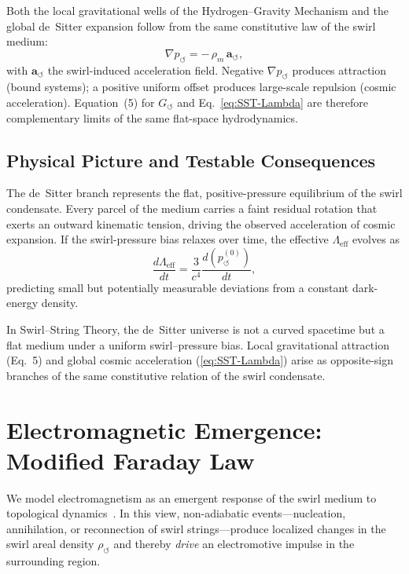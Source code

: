 \documentclass[10pt,reprint,aps,onecolumn,nofootinbib]{revtex4-2}
\begin{document}
        Both the local gravitational wells of the Hydrogen--Gravity Mechanism and the global de~Sitter expansion follow from the same constitutive law of the swirl medium:
        \[
            \nabla p_{\!\circlearrowleft} = -\,\rho_{\!m}\, \mathbf{a}_{\!\circlearrowleft},
        \]
        with $\mathbf{a}_{\!\circlearrowleft}$ the swirl-induced acceleration field.
        Negative $\nabla p_{\!\circlearrowleft}$ produces attraction (bound systems);
        a positive uniform offset produces large-scale repulsion (cosmic acceleration).
        Equation~(5) for $G_{\!\circlearrowleft}$ and Eq.~\eqref{eq:SST-Lambda} are therefore complementary limits of the same flat-space hydrodynamics.

    \subsection{Physical Picture and Testable Consequences}

        The de~Sitter branch represents the flat, positive-pressure equilibrium of the swirl condensate.
        Every parcel of the medium carries a faint residual rotation that exerts an outward kinematic tension, driving the observed acceleration of cosmic expansion.
        If the swirl-pressure bias relaxes over time, the effective $\Lambda_{\text{eff}}$ evolves as
        \begin{equation}
        \frac{d\Lambda_{\text{eff}}}{dt}
        = \frac{3}{c^{4}}\frac{d(p_{\!\circlearrowleft}^{(0)})}{dt},
        \end{equation}
        predicting small but potentially measurable deviations from a constant dark-energy density.

        \begin{tcolorbox}[colframe=gray, title={Summary}]
        In Swirl--String Theory, the de~Sitter universe is not a curved spacetime but a flat medium under a uniform swirl--pressure bias.
        Local gravitational attraction (Eq.~5) and global cosmic acceleration (\ref{eq:SST-Lambda}) arise as opposite-sign branches of the same constitutive relation of the swirl condensate.
        \end{tcolorbox}


\section{Electromagnetic Emergence: Modified Faraday Law}\label{sec:em}
We model electromagnetism as an emergent response of the swirl medium to topological dynamics~\cite{EM_G}. In this view, non-adiabatic events—nucleation, annihilation, or reconnection of swirl strings—produce localized changes in the swirl areal density $\rho_{\circlearrowleft}$ and thereby \emph{drive} an electromotive impulse in the surrounding region.
\end{document}
